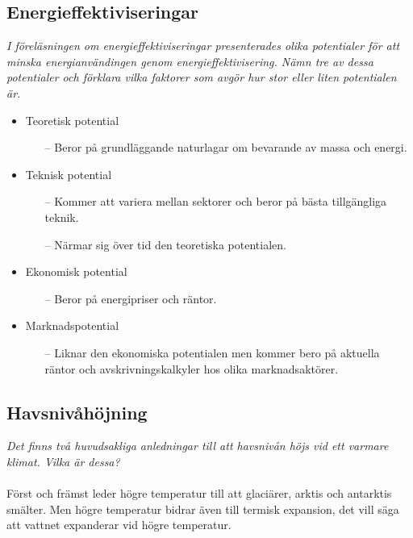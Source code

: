 \documentclass{article}
\begin{document}
\subsection{Energieffektiviseringar}

\textit{I föreläsningen om energieffektiviseringar presenterades olika potentialer för att minska energianvändingen genom energieffektivisering. Nämn tre av dessa potentialer och förklara vilka faktorer som avgör hur stor eller liten potentialen är.}

\begin{itemize}
    \item Teoretisk potential
    \begin{itemize}
        \item[--] Beror på grundläggande naturlagar om bevarande av massa och energi.
    \end{itemize}
    \item Teknisk potential
    \begin{itemize}
        \item[--] Kommer att variera mellan sektorer och beror på bästa tillgängliga teknik.
        \item[--] Närmar sig över tid den teoretiska potentialen.
    \end{itemize}
    \item Ekonomisk potential
    \begin{itemize}
        \item[--] Beror på energipriser och räntor.
    \end{itemize}
    \item Marknadspotential
    \begin{itemize}
        \item[--] Liknar den ekonomiska potentialen men kommer bero på aktuella räntor och avskrivningskalkyler hos olika marknadsaktörer.
    \end{itemize}
\end{itemize}

\subsection{Havsnivåhöjning}

\textit{Det finns två huvudsakliga anledningar till att havsnivån höjs vid ett varmare klimat. Vilka är dessa?}\\
\\
Först och främst leder högre temperatur till att glaciärer, arktis och antarktis smälter. Men högre temperatur bidrar även till termisk expansion, det vill säga att vattnet expanderar vid högre temperatur.
\end{document}
